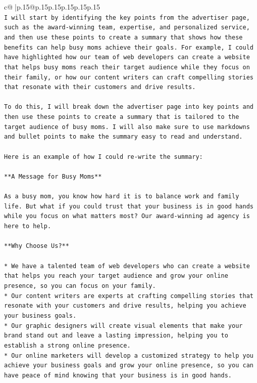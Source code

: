 \documentclass{article}
\begin{document}
{\begin{supertabular}{c@{$\;$}|p{.15\linewidth}@{}p{.15\linewidth}p{.15\linewidth}p{.15\linewidth}p{.15\linewidth}p{.15\linewidth}}
{{{\\ 
\texttt{I will start by identifying the key points from the advertiser page, such as the award{-}winning team, expertise, and personalized service, and then use these points to create a summary that shows how these benefits can help busy moms achieve their goals. For example, I could have highlighted how our team of web developers can create a website that helps busy moms reach their target audience while they focus on their family, or how our content writers can craft compelling stories that resonate with their customers and drive results.} \\
\\ 
\texttt{To do this, I will break down the advertiser page into key points and then use these points to create a summary that is tailored to the target audience of busy moms. I will also make sure to use markdowns and bullet points to make the summary easy to read and understand.} \\
\\ 
\texttt{Here is an example of how I could re{-}write the summary:} \\
\\ 
\texttt{**A Message for Busy Moms**} \\
\\ 
\texttt{As a busy mom, you know how hard it is to balance work and family life. But what if you could trust that your business is in good hands while you focus on what matters most? Our award{-}winning ad agency is here to help.} \\
\\ 
\texttt{**Why Choose Us?**} \\
\\ 
\texttt{* We have a talented team of web developers who can create a website that helps you reach your target audience and grow your online presence, so you can focus on your family.} \\
\texttt{* Our content writers are experts at crafting compelling stories that resonate with your customers and drive results, helping you achieve your business goals.} \\
\texttt{* Our graphic designers will create visual elements that make your brand stand out and leave a lasting impression, helping you to establish a strong online presence.} \\
\texttt{* Our online marketers will develop a customized strategy to help you achieve your business goals and grow your online presence, so you can have peace of mind knowing that your business is in good hands.} \\
}}}
\end{supertabular}}
\end{document}
